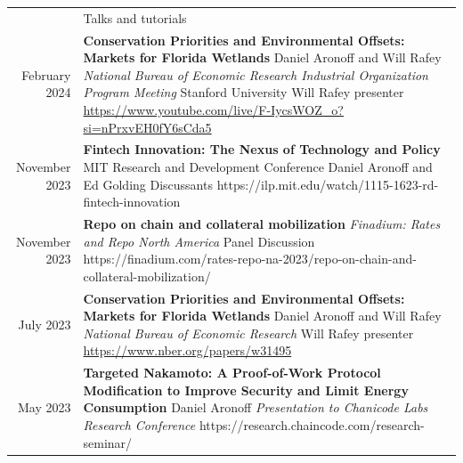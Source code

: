 \documentclass[letterpaper, 11pt]{article}
\newcommand{\headingfont}{\Large\color{OliveGreen}}
\newenvironment{SectionTable}[1]{
	\renewcommand*{\arraystretch}{1.7}
	\setlength{\tabcolsep}{10pt}
	\begin{longtable}{Rp{5.2in}} & #1 \\}
{\end{longtable}\vspace{-.3cm}}
\begin{document}
\begin{SectionTable}{\headingfont Talks and tutorials}

February 2024 &
\textbf{Conservation Priorities and Environmental Offsets: Markets for Florida Wetlands} \newline
Daniel Aronoff and Will Rafey \newline
\textit{National Bureau of Economic Research Industrial Organization Program Meeting}\newline
Stanford University\newline
Will Rafey presenter\newline
{\small{\url{https://www.youtube.com/live/F-IycsWOZ_o?si=nPrxvEH0fY6sCda5}}}\\

November 2023 &
\textbf{Fintech Innovation: The Nexus of Technology and Policy}\newline
MIT Research and Development Conference\newline
Daniel Aronoff and Ed Golding Discussants\newline
{https://ilp.mit.edu/watch/1115-1623-rd-fintech-innovation}\\

November 2023 &
\textbf{Repo on chain and collateral mobilization}\newline
\textit{Finadium: Rates and Repo North America}\newline
Panel Discussion\newline
{https://finadium.com/rates-repo-na-2023/repo-on-chain-and-collateral-mobilization/}\\


July 2023 &
\textbf{Conservation Priorities and Environmental Offsets: Markets for Florida Wetlands} \newline
Daniel Aronoff and Will Rafey \newline
\textit{National Bureau of Economic Research}\newline
Will Rafey presenter\newline
{\small{\url{https://www.nber.org/papers/w31495}}} \\


May 2023 &

\textbf{Targeted Nakamoto: A Proof-of-Work Protocol Modification to Improve Security and Limit Energy Consumption}\newline
Daniel Aronoff \newline
\textit{Presentation to Chanicode Labs Research Conference}\newline
{https://research.chaincode.com/research-seminar/}\\



\end{SectionTable}
\end{document}
